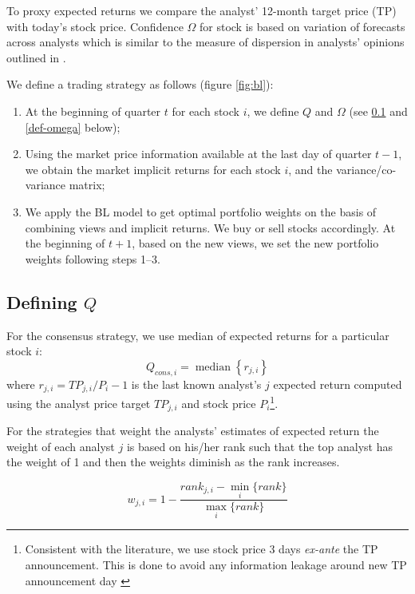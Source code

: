 \documentclass{article}\usepackage[]{graphicx}\usepackage[]{color}
\DeclareMathOperator*{\median}{median}
\begin{document}
To proxy expected returns we compare the analyst' 12-month target price (TP) with today's stock price. Confidence $\Omega$ for stock is based on variation  of forecasts across analysts which is similar to the measure of dispersion in analysts' opinions outlined in \cite{diether2002}.


We define a trading strategy as follows (figure \ref{fig:bl}):
\begin{enumerate}
\item  At the beginning of quarter $t$ for each stock $i$,   we define $Q$ and $\Omega$ (see \ref{def-q} and \ref{def-omega} below);

\item Using the market price information available at the last day of quarter $t-1$, we obtain the market implicit returns for each stock $i$,  and the variance/co-variance matrix;

\item We apply the BL model to get  optimal portfolio weights on the basis of combining views and implicit returns. We  buy or sell stocks accordingly. At the beginning of $t+1$, based on the new views, we set the new portfolio weights following  steps 1--3.
\end{enumerate}

\subsection{Defining $Q$}
\label{def-q}

For the consensus strategy, we use median of expected returns for a particular stock $i$:
\begin{equation}
\label{consq}
Q_{cons,i}= \median \left\{r_{j,i}\right\}
\end{equation}
where $r_{j,i}=TP_{j,i}/P_{i}-1$  is the last known analyst's $j$ expected return computed using the analyst price target $TP_{j,i}$ and stock price $P_{i}$\footnote{Consistent with the literature, we use stock price 3 days \emph{ex-ante} the TP announcement. This is done to avoid any information leakage around new TP announcement day \citep{bonini2010}}. 

For the strategies that weight the analysts' estimates of expected return the weight of each analyst $j$ is based on his/her rank such that the top analyst has the weight of 1 and then the weights diminish as the rank increases.


\begin{equation}
\label{eq:weight}
w_{j,i}=1-\frac{rank_{j,i}-\min_i{ \{rank \} }}{\max_i{\{rank \}}}
\end{equation}
\end{document}
